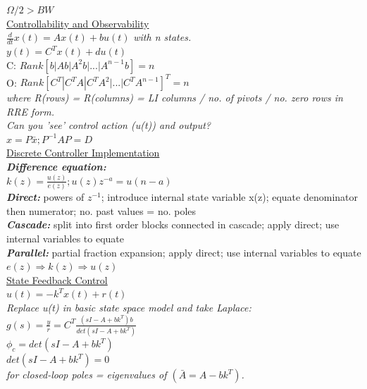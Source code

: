 \documentclass[a4paper, 10pt, titlepage]{article}
\begin{document}
\begin{paracol}{3}[]
$\Omega/2>BW$\\
\underline{Controllability and Observability} \\
$\frac{d}{dt} x(t) = Ax(t) + bu(t)$ \textit{with n states.} \\
$y(t) = C^Tx(t) + du(t)$ \\
C: $Rank[b|Ab|A^2b|...|A^{n-1}b] = n$ \\
O: $Rank[C^T|C^TA|C^TA^2|...|C^TA^{n-1}]^T = n$ \\
\textit{where R(rows) = R(columns) = LI columns / no. of pivots / no. zero rows in RRE form.} \\
\textit{Can you 'see' control action (u(t)) and output?}\\
$x=P\bar{x}; P^{-1}AP = D$ \\
\underline{Discrete Controller Implementation} \\
\textbf{\textit{Difference equation:}} \\
$k(z) = \frac{u(z)}{e(z)};u(z)z^{-a} = u(n-a)$ \\
\textbf{\textit{Direct:}} powers of $z^{-1}$; introduce internal state variable x(z); equate denominator then numerator; no. past values = no. poles \\
\textbf{\textit{Cascade:}} split into first order blocks connected in cascade; apply direct; use internal variables to equate \\
\textbf{\textit{Parallel:}} partial fraction expansion; apply direct; use internal variables to equate \\
$e(z)\Rightarrow k(z) \Rightarrow u(z)$ \\

\switchcolumn 
\underline{State Feedback Control} \\
$u(t) = -k^Tx(t) + r(t)$ \\
\textit{Replace u(t) in basic state space model and take Laplace:} \\
$g(s) = \frac{y}{r} = C^T \frac{(sI-A+bk^T)b}{det(sI-A+bk^T)}$ \\
$\phi_c = det(sI-A+bk^T)$ \\ 
$det(sI-A+bk^T) = 0$ \\ 
\textit{for closed-loop poles = eigenvalues of $(\bar{A} = A - bk^T)$.} \\


\end{paracol}
\end{document}
